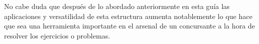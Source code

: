No cabe duda que después de lo abordado anteriormente en esta guía las aplicaciones y versatilidad de esta estructura aumenta notablemente lo que hace que sea una herramienta importante en el arsenal de un concursante a la hora de resolver los ejercicios o problemas.